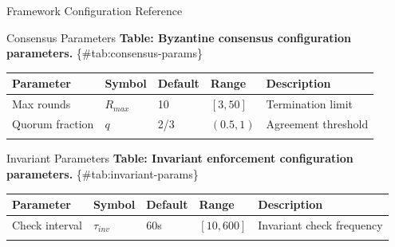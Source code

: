 \documentclass[
  ignorenonframetext,
]{beamer}
\newcounter{none} %
\begin{document}
\begin{frame}[fragile]{Framework Configuration Reference}
\begin{block}{Consensus Parameters}
\protect{}\label{sec:consensus-params}
\textbf{Table: Byzantine consensus configuration parameters.}
\{\#tab:consensus-params\}

{\def\LTcaptype{none} %
\begin{longtable}[]{@{}lllll@{}}
\toprule\noalign{}
Parameter & Symbol & Default & Range & Description \\
\midrule\noalign{}
\endhead
Max rounds & \(R_{max}\) & 10 & \([3, 50]\) & Termination limit \\
Quorum fraction & \(q\) & 2/3 & \((0.5, 1)\) & Agreement threshold \\
\bottomrule\noalign{}
\end{longtable}
}
\end{block}

\begin{block}{Invariant Parameters}
\protect{}\label{sec:invariant-params}
\textbf{Table: Invariant enforcement configuration parameters.}
\{\#tab:invariant-params\}

{\def\LTcaptype{none} %
\begin{longtable}[]{@{}
  >{\raggedright\arraybackslash}p{}
  >{\raggedright\arraybackslash}p{}
  >{\raggedright\arraybackslash}p{}
  >{\raggedright\arraybackslash}p{}
  >{\raggedright\arraybackslash}p{}@{}}
\toprule\noalign{}
\begin{minipage}[b]{\linewidth}\raggedright
Parameter
\end{minipage} & \begin{minipage}[b]{\linewidth}\raggedright
Symbol
\end{minipage} & \begin{minipage}[b]{\linewidth}\raggedright
Default
\end{minipage} & \begin{minipage}[b]{\linewidth}\raggedright
Range
\end{minipage} & \begin{minipage}[b]{\linewidth}\raggedright
Description
\end{minipage} \\
\midrule\noalign{}
\endhead
Check interval & \(\tau_{inv}\) & 60s & \([10, 600]\) & Invariant check
frequency \\
\bottomrule\noalign{}
\end{longtable}
}
\end{block}


\end{frame}
\end{document}

